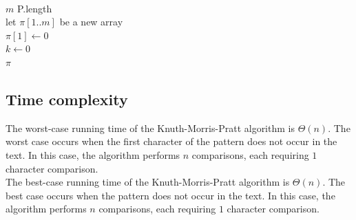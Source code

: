 \documentclass[11pt]{article}
\begin{document}
            \begin{algorithm}[H] \label{alg:compute_prefix_function}
                \SetAlgoLined
                \vspace{0.5em}
                 \\
                \vspace{0.5em}

                    $m$ \leftarrow P.length\; \\
                    let $\pi[1..m]$ be a new array\; \\
                    $\pi[1] \leftarrow 0$\; \\
                    $k \leftarrow 0$\; \\
                    \Return $\pi$\;

            \end{algorithm}

        \subsection{Time complexity} \label{subsec:kmp_time_complexity}

            The worst-case running time of the Knuth-Morris-Pratt algorithm is $\Theta(n)$.
            The worst case occurs when the first character of the pattern does not occur in the text.
            In this case, the algorithm performs $n$ comparisons, each requiring $1$ character comparison. \\

            The best-case running time of the Knuth-Morris-Pratt algorithm is $\Theta(n)$.
            The best case occurs when the pattern does not occur in the text.
            In this case, the algorithm performs $n$ comparisons, each requiring $1$ character comparison. \\
\end{document}
